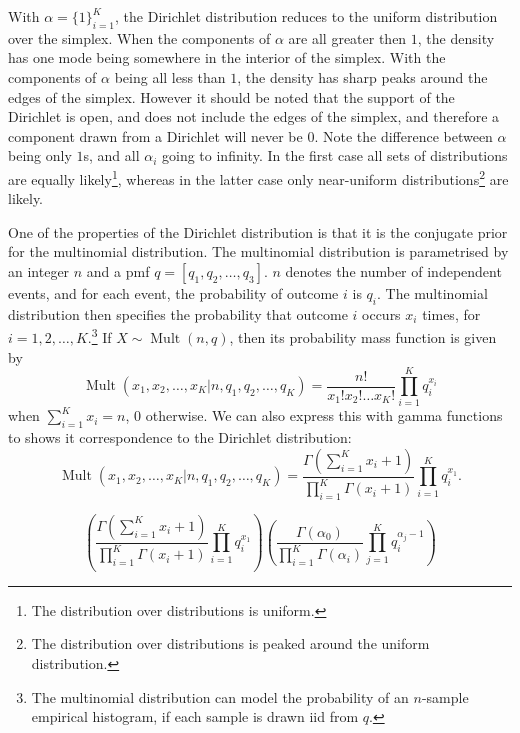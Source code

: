 With $\alpha = \{1\}_{i=1}^K$, the Dirichlet distribution reduces to the uniform distribution over the simplex. When the components of $\alpha$ are all greater then $1$, the density has one mode being somewhere in the interior of the simplex. With the components of $\alpha$ being all less than $1$, the density has sharp peaks around the edges of the simplex. However it should be noted that the support of the Dirichlet is open, and does not include the edges of the simplex, and therefore a component drawn from a Dirichlet will never be $0$. Note the difference between $\alpha$ being only $1$s, and all $\alpha_i$ going to infinity. In the first case all sets of distributions are equally likely\footnote{The distribution over distributions is uniform.}, whereas in the latter case only near-uniform distributions\footnote{The distribution over distributions is peaked around the uniform distribution.} are likely.

One of the properties of the Dirichlet distribution is that it is the conjugate prior for the multinomial distribution. The multinomial distribution is parametrised by an integer $n$ and a pmf $q = [q_1, q_2, \ldots, q_3]$. $n$ denotes the number of independent events, and for each event, the probability of outcome $i$ is $q_i$. The multinomial distribution then specifies the probability that outcome $i$ occurs $x_i$ times, for $i=1,2,\ldots,K$.\footnote{The multinomial distribution can model the probability of an $n$-sample empirical histogram, if each sample is drawn iid from $q$.} If $X\sim\operatorname{Mult}(n,q)$, then its probability mass function is given by
\begin{equation}
	\operatorname{Mult}(x_1,x_2,\ldots,x_K|n, q_1,q_2,\ldots,q_K) = \frac{n!}{x_1!x_2!\ldots x_K!}\prod_{i=1}^K q_i^{x_i}
\end{equation}
when $\sum_{i=1}^K x_i = n$, $0$ otherwise. We can also express this with gamma functions to shows it correspondence to the Dirichlet distribution:
\begin{equation}
	\operatorname{Mult}(x_1, x_2,\ldots,x_K|n, q_1,q_2,\ldots,q_K) = \frac{\Gamma(\sum_{i=1}^K x_i+1)}{\prod_{i=1}^K \Gamma(x_i+1)}\prod_{i=1}^K q_i^{x_1}.
\end{equation}

\begin{equation}
	\left(\frac{\Gamma(\sum_{i=1}^K x_i+1)}{\prod_{i=1}^K \Gamma(x_i+1)}\prod_{i=1}^K q_i^{x_1}\right)\left(\frac{\Gamma(\alpha_0)}{\prod_{i=1}^K \Gamma(\alpha_i)} \prod_{j=1}^K q_i^{\alpha_j-1}\right)
\end{equation}


